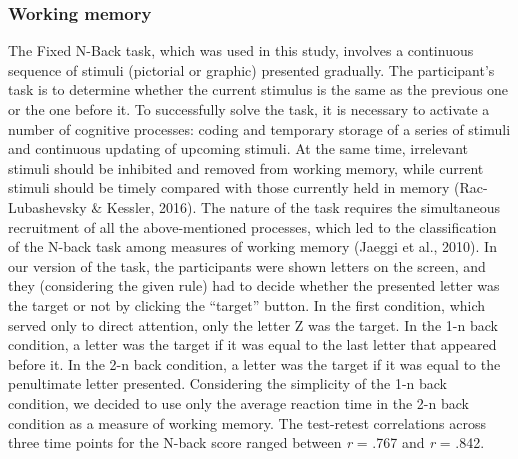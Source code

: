 \documentclass[authordate, empirical]{jote-new-article}
\begin{document}
\subsubsection{Working memory}
The Fixed N-Back task, which was used in this study, involves a continuous sequence of stimuli (pictorial or graphic) presented gradually. The participant's task is to determine whether the current stimulus is the same as the previous one or the one before it. To successfully solve the task, it is necessary to activate a number of cognitive processes: coding and temporary storage of a series of stimuli and continuous updating of upcoming stimuli. At the same time, irrelevant stimuli should be inhibited and removed from working memory, while current stimuli should be timely compared with those currently held in memory (Rac-Lubashevsky \& Kessler, 2016). The nature of the task requires the simultaneous recruitment of all the above-mentioned processes, which led to the classification of the N-back task among measures of working memory (Jaeggi et al., 2010). In our version of the task, the participants were shown letters on the screen, and they (considering the given rule) had to decide whether the presented letter was the target or not by clicking the “target” button. In the first condition, which served only to direct attention, only the letter Z was the target. In the 1-n back condition, a letter was the target if it was equal to the last letter that appeared before it. In the 2-n back condition, a letter was the target if it was equal to the penultimate letter presented. Considering the simplicity of the 1-n back condition, we decided to use only the average reaction time in the 2-n back condition as a measure of working memory. The test-retest correlations across three time points for the N-back score ranged between \emph{r} = .767 and \emph{r} = .842.
\end{document}
